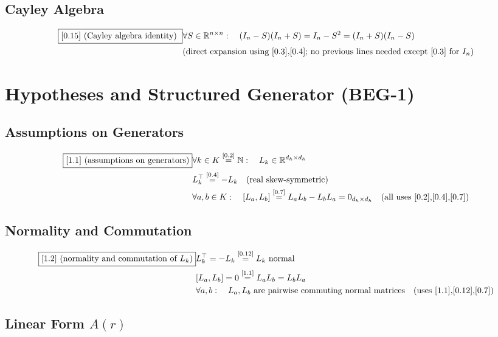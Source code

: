 \documentclass[11pt]{article}
\newcommand{\eqref}[1]{\overset{[#1]}{=}}
\begin{document}
\subsection{Cayley Algebra}

\begin{align}
\boxed{[0.15] \text{ (Cayley algebra identity) }}
&\forall S\in\mathbb{R}^{n\times n}:\quad
(I_n - S)(I_n + S)
=
I_n - S^2
=
(I_n + S)(I_n - S) \notag\\
&(\text{direct expansion using [0.3],[0.4]; no previous lines needed except [0.3] for }I_n\text{)}
\end{align}

\section{Hypotheses and Structured Generator (BEG-1)}

\subsection{Assumptions on Generators}

\begin{align}
\boxed{[1.1] \text{ (assumptions on generators)}}
&\forall k\in K
\eqref{0.2}
\mathbb{N}:\quad
L_k
\in
\mathbb{R}^{d_h\times d_h} \notag\\
&L_k^\top
\eqref{0.4}
-L_k
\quad(\text{real skew-symmetric}) \notag\\
&\forall a,b\in K:\quad
[L_a,L_b]
\eqref{0.7}
L_aL_b - L_bL_a
=
0_{d_h\times d_h}
\quad(\text{all uses [0.2],[0.4],[0.7]})
\end{align}

\subsection{Normality and Commutation}

\begin{align}
\boxed{[1.2] \text{ (normality and commutation of }L_k\text{)}}
&L_k^\top
=
-L_k
\eqref{0.12}
L_k
\text{ normal} \notag\\
&[L_a,L_b]
=
0
\eqref{1.1}
L_a L_b
=
L_b L_a \notag\\
&\forall a,b:\quad
L_a,L_b
\text{ are pairwise commuting normal matrices}
\quad(\text{uses [1.1],[0.12],[0.7]})
\end{align}

\subsection{Linear Form $A(r)$}
\end{document}
